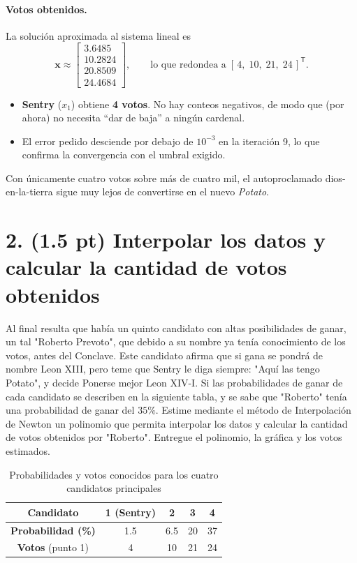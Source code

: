 \paragraph{Votos obtenidos.}
La solución aproximada al sistema lineal es
\[
\mathbf{x}\approx
\begin{bmatrix}
 3.6485\\ 10.2824\\ 20.8509\\ 24.4684
\end{bmatrix},
\qquad
\text{lo que redondea a}\;
\boxed{[\,4,\;10,\;21,\;24\,]^{\mathsf T}}.
\]

\begin{itemize}
  \item \textbf{Sentry} (\(x_1\)) obtiene \textbf{4 votos}.
        No hay conteos negativos, de modo que (por ahora) no necesita
        ``dar de baja'' a ningún cardenal.
  \item El error pedido desciende por debajo de \(10^{-3}\) en la iteración 9,
        lo que confirma la convergencia con el umbral exigido.
\end{itemize}

\noindent
Con únicamente cuatro votos sobre más de cuatro mil, el autoproclamado
dios-en-la-tierra sigue muy lejos de convertirse en el nuevo \emph{Potato}.

\section{2. (1.5 pt) Interpolar los datos y calcular la cantidad de votos obtenidos}

Al final resulta que había un quinto candidato con altas posibilidades de ganar,
un tal "Roberto Prevoto", que debido a su nombre ya tenía conocimiento de los
votos, antes del Conclave. Este candidato afirma que si gana se pondrá de nombre
Leon XIII, pero teme que Sentry le diga siempre: "Aquí las tengo Potato", y
decide Ponerse mejor Leon XIV-I. Si las probabilidades de ganar de cada
candidato se describen en la siguiente tabla, y se sabe que "Roberto" tenía una
probabilidad de ganar del $35\%$. Estime mediante el método de Interpolación de
Newton un polinomio que permita interpolar los datos y calcular la cantidad de
votos obtenidos por "Roberto". Entregue el polinomio, la gráfica y los votos
estimados.

\begin{table}[h]
    \centering
    \begin{tabular}{|c|c|c|c|c|}
        \hline
        \textbf{Candidato} & 1 (Sentry) & 2 & 3 & 4 \\ \hline
        \textbf{Probabilidad (\%)} & 1.5 & 6.5 & 20 & 37 \\ \hline
        \textbf{Votos} (punto 1) & 4 & 10 & 21 & 24 \\ \hline
    \end{tabular}
    \caption{Probabilidades y votos conocidos para los cuatro candidatos principales}
    \label{tab:prob_votos_4}
\end{table}

